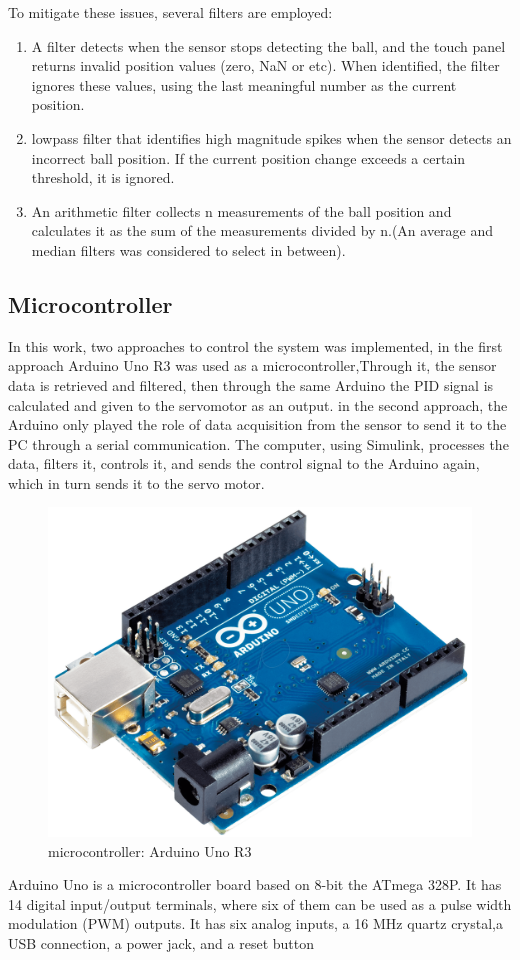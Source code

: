 To mitigate these issues, several filters are employed:
\begin{enumerate}
    \item A filter detects when the sensor stops detecting the ball, and the touch panel returns invalid position values (zero, NaN or etc). When identified, the filter ignores these values, using the last meaningful number as the current position.
    \item lowpass filter that identifies high magnitude spikes when the sensor detects an incorrect ball position. If the current position change exceeds a certain threshold, it is ignored.
    \item An arithmetic filter collects n measurements of the ball position and calculates it as the sum of the measurements divided by n.(An average and median filters was considered to select in between).
\end{enumerate}

\subsection{Microcontroller}
In this work, two approaches to control the system was implemented, in the first approach Arduino Uno R3 was used as a microcontroller,Through it, the sensor data is retrieved and filtered, then through the same Arduino the PID signal is calculated and given to the servomotor as an output. in the second approach, the Arduino only played the role of data acquisition from the sensor to send it to the PC through a serial communication. The computer, using Simulink, processes the data, filters it, controls it, and sends the control signal to the Arduino again, which in turn sends it to the servo motor.
\begin{figure}[h]
    \centering
    \includegraphics[width=0.75\linewidth]{ArduinoUnoR3.png}
    \caption{microcontroller: Arduino Uno R3}
    \label{fig:enter-label}
\end{figure}
Arduino Uno is a microcontroller board based on 8-bit the ATmega 328P. It has 14 digital input/output terminals, where six of them can be used as a pulse width modulation (PWM) outputs. It has six analog inputs, a 16 MHz quartz crystal,a USB connection, a power jack, and a reset button

